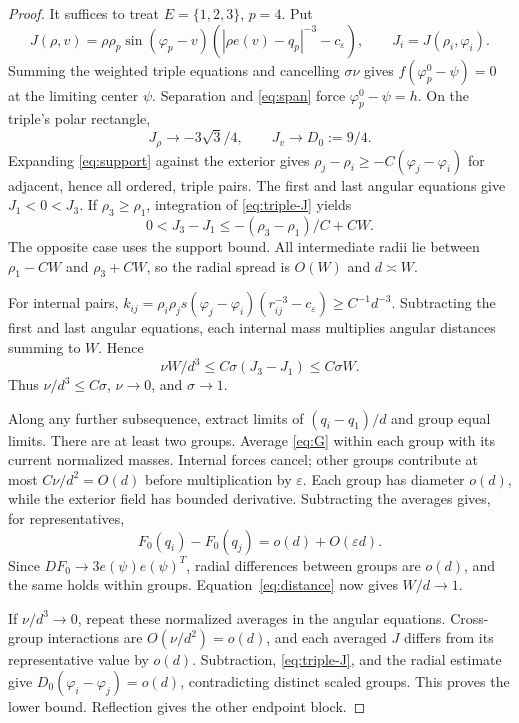 \documentclass[11pt,a4paper]{article}
\numberwithin{equation}{section}
\theoremstyle{remark}
\newcommand{\eps}{\varepsilon}
\begin{document}
\begin{proof}
It suffices to treat $E=\{1,2,3\}$, $p=4$. Put
\[
 J(\rho,v)=\rho\rho_p\sin(\varphi_p-v)(|\rho e(v)-q_p|^{-3}-c_\eps),\qquad
 J_i=J(\rho_i,\varphi_i).
\]
Summing the weighted triple equations and cancelling $\sigma\nu$ gives $f(\varphi_p^0-\psi)=0$ at the limiting center $\psi$. Separation and \eqref{eq:span} force $\varphi_p^0-\psi=h$. On the triple's polar rectangle,
\begin{equation}\label{eq:triple-J}
 J_\rho\to-3\sqrt3/4,\qquad J_v\to D_0:=9/4.
\end{equation}
Expanding \eqref{eq:support} against the exterior gives $\rho_j-\rho_i\ge-C(\varphi_j-\varphi_i)$ for adjacent, hence all ordered, triple pairs. The first and last angular equations give $J_1<0<J_3$. If $\rho_3\ge\rho_1$, integration of \eqref{eq:triple-J} yields
\[
 0<J_3-J_1\le-(\rho_3-\rho_1)/C+CW.
\]
The opposite case uses the support bound. All intermediate radii lie between $\rho_1-CW$ and $\rho_3+CW$, so the radial spread is $O(W)$ and $d\asymp W$.

For internal pairs, $k_{ij}=\rho_i\rho_j s(\varphi_j-\varphi_i)(r_{ij}^{-3}-c_\eps)\ge C^{-1}d^{-3}$. Subtracting the first and last angular equations, each internal mass multiplies angular distances summing to $W$. Hence
\[
 \nu W/d^3\le C\sigma(J_3-J_1)\le C\sigma W.
\]
Thus $\nu/d^3\le C\sigma$, $\nu\to0$, and $\sigma\to1$.

Along any further subsequence, extract limits of $(q_i-q_1)/d$ and group equal limits. There are at least two groups. Average \eqref{eq:G} within each group with its current normalized masses. Internal forces cancel; other groups contribute at most $C\nu/d^2=O(d)$ before multiplication by $\eps$. Each group has diameter $o(d)$, while the exterior field has bounded derivative. Subtracting the averages gives, for representatives,
\[
 F_0(q_i)-F_0(q_j)=o(d)+O(\eps d).
\]
Since $DF_0\to3e(\psi)e(\psi)^T$, radial differences between groups are $o(d)$, and the same holds within groups. Equation~\eqref{eq:distance} now gives $W/d\to1$.

If $\nu/d^3\to0$, repeat these normalized averages in the angular equations. Cross-group interactions are $O(\nu/d^2)=o(d)$, and each averaged $J$ differs from its representative value by $o(d)$. Subtraction, \eqref{eq:triple-J}, and the radial estimate give $D_0(\varphi_i-\varphi_j)=o(d)$, contradicting distinct scaled groups. This proves the lower bound. Reflection gives the other endpoint block.
\end{proof}
\end{document}
